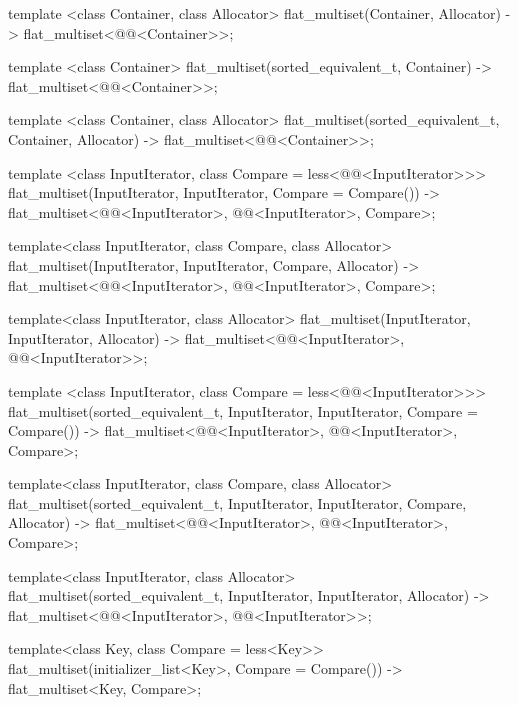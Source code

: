 \begin{codeblock}
\begin{codeblock}
\begin{codeblock}
\begin{addedblock}
\begin{codeblock}
  template <class Container, class Allocator>
    flat_multiset(Container, Allocator)
      -> flat_multiset<@@<Container>>;

  template <class Container>
    flat_multiset(sorted_equivalent_t, Container)
      -> flat_multiset<@@<Container>>;

  template <class Container, class Allocator>
    flat_multiset(sorted_equivalent_t, Container, Allocator)
      -> flat_multiset<@@<Container>>;

  template <class InputIterator, class Compare = less<@@<InputIterator>>>
    flat_multiset(InputIterator, InputIterator, Compare = Compare())
      -> flat_multiset<@@<InputIterator>, @@<InputIterator>, Compare>;

  template<class InputIterator, class Compare, class Allocator>
    flat_multiset(InputIterator, InputIterator, Compare, Allocator)
      -> flat_multiset<@@<InputIterator>, @@<InputIterator>, Compare>;

  template<class InputIterator, class Allocator>
    flat_multiset(InputIterator, InputIterator, Allocator)
      -> flat_multiset<@@<InputIterator>, @@<InputIterator>>;

  template <class InputIterator, class Compare = less<@@<InputIterator>>>
    flat_multiset(sorted_equivalent_t, InputIterator, InputIterator, Compare = Compare())
      -> flat_multiset<@@<InputIterator>, @@<InputIterator>, Compare>;

  template<class InputIterator, class Compare, class Allocator>
    flat_multiset(sorted_equivalent_t, InputIterator, InputIterator, Compare, Allocator)
      -> flat_multiset<@@<InputIterator>, @@<InputIterator>, Compare>;

  template<class InputIterator, class Allocator>
    flat_multiset(sorted_equivalent_t, InputIterator, InputIterator, Allocator)
      -> flat_multiset<@@<InputIterator>, @@<InputIterator>>;

  template<class Key, class Compare = less<Key>>
    flat_multiset(initializer_list<Key>, Compare = Compare())
      -> flat_multiset<Key, Compare>;


\end{codeblock}
\end{addedblock}
\end{codeblock}
\end{codeblock}
\end{codeblock}
